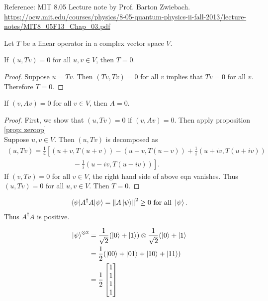 \begin{screen}
	Reference: MIT 8.05 Lecture note  by Prof. Barton Zwiebach.\\
	\url{https://ocw.mit.edu/courses/physics/8-05-quantum-physics-ii-fall-2013/lecture-notes/MIT8_05F13_Chap_03.pdf}

	\begin{prop} \label{prop: zeroop}
		Let $T$ be a linear operator in a complex vector space $V$.

		If $(u, Tv) = 0$ for all $u, v \in V$, then $T = 0$.
	\end{prop}

	\begin{proof}
		Suppose $u = Tv$. Then $(Tv, Tv) = 0$ for all $v$ implies that $Tv = 0$ for all $v$. Therefore $T = 0$.
	\end{proof}

	\begin{thm}
		If $(v, Av) = 0$ for all $v \in V$, then $A = 0$.
	\end{thm}

	\begin{proof}
		First, we show that $(u, Tv) = 0$ if $(v, Av) = 0$. Then apply proposition \ref{prop: zeroop}\\
		Suppose $u, v \in V$. Then $(u, Tv)$ is decomposed as
		\begin{align*}
			(u, Tv) = \frac{1}{4} \left[ (u+v, T(u+v)) - (u-v, T(u-v)) + \frac{1}{i} (u+iv, T(u+iv)) \right.\\
			\left. \hspace{4cm} - \frac{1}{i} (u-iv, T(u-iv))  \right].
		\end{align*}
		If $(v, Tv) = 0$ for all $v \in V$, the right hand side of above eqn vanishes. Thus $(u, Tv) = 0$ for all $u, v \in V$.
		Then $T = 0$.
	\end{proof}


\end{screen}


\begin{align*}
	\braket{\psi | A^\dagger A | \psi} = \left\lVert A \ket{\psi}\right\rVert^2 \geq 0 \text{ for all } \ket{\psi}.
\end{align*}
Thus $A^\dagger A$ is positive.


\begin{align*}
	\ket{\psi}^{\otimes 2} &= \frac{1}{\sqrt{2}} (\ket{0} + \ket{1}) \otimes \frac{1}{\sqrt{2}} (\ket{0} + \ket{1}\\
		&= \frac{1}{2} (\ket{00}  + \ket{01} + \ket{10} + \ket{11}  )\\
		&= \frac{1}{2} \begin{bmatrix}
			1 \\
			1 \\
			1 \\
			1
		\end{bmatrix}
\end{align*}

